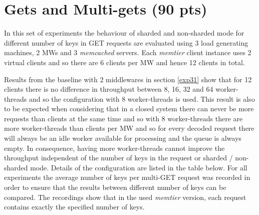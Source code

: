 \documentclass[report.tex]{subfiles}
\begin{document}
\newpage
\section{Gets and Multi-gets (90 pts)}\label{exp5}


In this set of experiments the behaviour of sharded and non-sharded mode for different number of keys in GET requests are evaluated using 3 load generating machines, 2 MWs and 3 \emph{memcached} servers.
Each \emph{memtier} client instance uses 2 virtual clients and so there are 6 clients per MW and hence 12 clients in total. 

Results from the baseline with 2 middlewares in section \ref{exp31} show that for 12 clients there is no difference in throughput between 8, 16, 32 and 64 worker-threads and so the configuration with 8 worker-threads is used. This result is also to be expected when considering that in a closed system there can never be more requests than clients at the same time and so with 8 worker-threads there are more worker-threads than clients per MW and so for every decoded request there will always be an idle worker available for processing and the queue is always empty. In consequence, having more worker-threads cannot improve the throughput independent of the number of keys in the request or sharded / non-sharded mode.
Details of the configuration are listed in the table below.
For all experiments the average number of keys per multi-GET request was recorded in order to ensure that the results between different number of keys can be compared. The recordings show that in the used \emph{memtier} version, each request contains exactly the specified number of keys.
\end{document}
